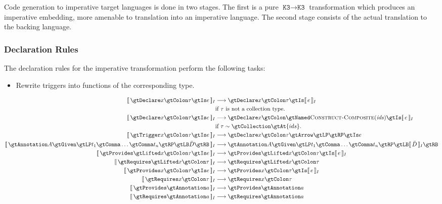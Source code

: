 \documentclass[10pt]{article}
\newcommand{\K}{\ensuremath{\texttt{K3}}}
\begin{document}
Code generation to imperative target languages is done in two stages. The first is a pure $\K
\rightarrow \K$ transformation which produces an imperative embedding, more amenable to
translation into an imperative language. The second stage consists of the actual translation to
the backing language.

\subsubsection{Declaration Rules}

The declaration rules for the imperative transformation perform the following tasks:

\begin{itemize}
    \item Rewrite triggers into functions of the corresponding type.
\end{itemize}
%
\begin{adjustwidth}{-0.5in}{-0.5in}\begin{align*}
    \eqI{\gtDeclare x \gtColon \tau \gtIs e}
        {\gtDeclare x \gtColon \tau \gtIs \intI{e}}
        {if $\tau$ is not a collection type.} \\
    \eqI{\gtDeclare x \gtColon \tau \gtIs e}
        {\gtDeclare x \gtColon \gtNamed \ConstructComposite{ids} \gtIs \intI{e}}
        {if $\tau \sim \gtCollection \gtAt \{ids\}$.} \\
    \eqI{\gtTrigger x \gtColon \tau \gtIs e}
        {\gtDeclare x \gtColon \tau \gtArrow \gtLP \gtRP \gtIs e}
        {} \\
    \eqI{\gtAnnotation A \gtGiven \gtLP t_1 \gtComma \ldots \gtComma t_n \gtRP \gtLB \bar{D} \gtRB}
        {\gtAnnotation A \gtGiven \gtLP t_1 \gtComma \ldots \gtComma t_n \gtRP \gtLB \intI{\bar{D}} \gtRB}{} \\
    \eqI{\gtProvides \gtLifted x \gtColon \tau \gtIs e}
        {\gtProvides \gtLifted x \gtColon \tau \gtIs \intI{e}}{} \\
    \eqI{\gtRequires \gtLifted x \gtColon \tau}
        {\gtRequires \gtLifted x \gtColon \tau}{} \\
    \eqI{\gtProvides x \gtColon \tau \gtIs e}
        {\gtProvides x \gtColon \tau \gtIs \intI{e}}{} \\
    \eqI{\gtRequires x \gtColon \tau}
        {\gtRequires x \gtColon \tau}{} \\
    \eqI{\gtProvides \gtAnnotation a}
        {\gtProvides \gtAnnotation a}{} \\
    \eqI{\gtRequires \gtAnnotation a}
        {\gtRequires \gtAnnotation a}{}
\end{align*}\end{adjustwidth}
\end{document}
